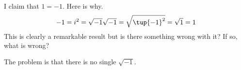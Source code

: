 \begin{enumialphparenastyle}
\begin{ex} I claim that $1=-1$. Here is why.
\begin{equation*}
-1=i^{2}=\sqrt{-1}\sqrt{-1}=\sqrt{\tup{-1} ^{2}}=\sqrt{1}=1
\end{equation*}
This is clearly a remarkable result but is there something wrong with it? If
so, what is wrong? 
\begin{sol}
The problem is that there is no single $\sqrt{-1}$.
\end{sol}
\end{ex}

\end{enumialphparenastyle}

